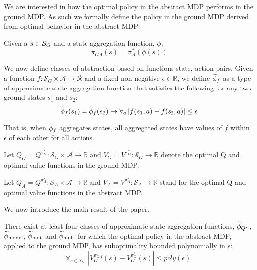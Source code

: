 We are interested in how the optimal policy in the abstract \ac{MDP} performs in the ground \ac{MDP}. As such we formally define the policy in the ground \ac{MDP} derived from optimal behavior in the abstract \ac{MDP}:

Given a $s \in \mathcal{S}_G$ and a state aggregation function, $\phi$, 
\begin{equation}
\pi_{GA}(s)=\pi_A^*(\phi(s))
\end{equation}
\edefn

We now define classes of abstraction based on functions state, action pairs.
Given a function $f: \mathcal{S}_G \times \mathcal{A} \rightarrow \mathcal{R}$ and a fixed non-negative $\epsilon \in \mathbb{R}$, we define $\widetilde \phi_f$ as a type of approximate state-aggregation function that satisfies the following for any two ground states $s_1$ and $s_2$: 
\begin{equation}
\label{eq:phi_f}
\widetilde \phi_f(s_1) = \widetilde \phi_f(s_2) \rightarrow \forall_a \left|f(s_1, a) - f(s_2, a)\right| \leq \epsilon
\end{equation}
\edefn

That is, when $\widetilde \phi_f$ aggregates states, all aggregated states have values of $f$ within $\epsilon$ of each other for all actions.

Let $Q_G = Q^{\pi_G^*} : \mathcal{S}_G \times \mathcal{A} \rightarrow \mathbb{R} $ and $V_G = V^{\pi_G^*}: \mathcal{S}_G \rightarrow \mathbb{R} $ denote the optimal Q and optimal value functions in the ground \ac{MDP}.
\edefn

Let $Q_A  = Q^{\pi_A^*}: \mathcal{S}_A \times \mathcal{A} \rightarrow \mathbb{R}$ and $V_A  = V^{\pi_A^*}: \mathcal{S}_A \rightarrow \mathbb{R}$  stand for the optimal Q and optimal value functions in the abstract \ac{MDP}.
\edefn

We now introduce the main result of the paper.

\begin{thm}
There exist at least four classes of approximate state-aggregation functions, $\widetilde \phi_{Q^*}$, $\widetilde \phi_{\text{model}}$, $\widetilde \phi_{\text{bolt}}$ and $\widetilde \phi_{\text{mult}}$ for which the optimal policy in the abstract \ac{MDP}, applied to the ground \ac{MDP}, has suboptimality bounded polynomially in $\epsilon$:
\begin{equation}
\forall_{s \in \mathcal{S}_G}: | V_G^{\pi_{GA}}(s) - V_G^{\pi_G^*}(s) | \leq poly(\epsilon).
\end{equation}
\end{thm}

